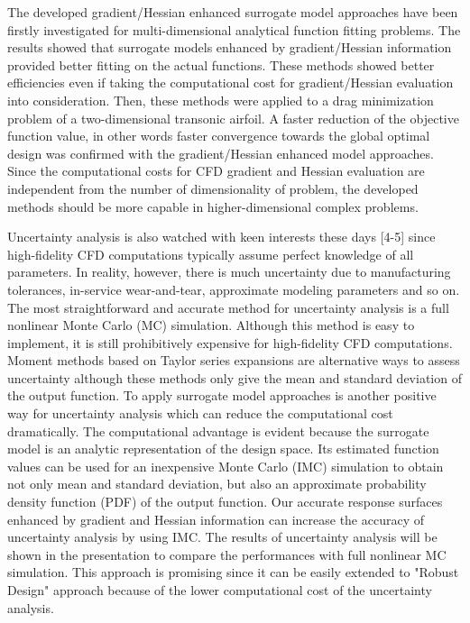 \documentclass{report}
\begin{document}
The developed gradient/Hessian enhanced surrogate model approaches have
been firstly investigated for multi-dimensional analytical function
fitting problems. The results showed that surrogate models enhanced by
gradient/Hessian information provided better fitting on the actual
functions. These methods showed better efficiencies even if taking the
computational cost for gradient/Hessian evaluation into consideration.
Then, these methods were applied to a drag minimization problem of a
two-dimensional transonic airfoil. A faster reduction of the objective
function value, in other words faster convergence towards the global
optimal design was confirmed with the gradient/Hessian enhanced model
approaches. Since the computational costs for CFD gradient and Hessian
evaluation are independent from the number of dimensionality of problem,
the developed methods should be more capable in higher-dimensional
complex problems.

Uncertainty analysis is also watched with keen interests these days [4-5]
since high-fidelity CFD computations typically assume perfect knowledge
of all parameters. In reality, however, there is much uncertainty due to
manufacturing tolerances, in-service wear-and-tear, approximate modeling
parameters and so on. The most straightforward and accurate method for
uncertainty analysis is a full nonlinear Monte Carlo (MC) simulation.
Although this method is easy to implement, it is still prohibitively
expensive for high-fidelity CFD computations. Moment methods based on
Taylor series expansions are alternative ways to assess uncertainty
although these methods only give the mean and standard deviation of the
output function. To apply surrogate model approaches is another positive
way for uncertainty analysis which can reduce the computational cost
dramatically. The computational advantage is evident because the
surrogate model is an analytic representation of the design space. Its
estimated function values can be used for an inexpensive Monte Carlo
(IMC) simulation to obtain not only mean and standard deviation, but also
an approximate probability density function (PDF) of the output function.
Our accurate response surfaces enhanced by gradient and Hessian
information can increase the accuracy of uncertainty analysis by using
IMC. The results of uncertainty analysis will be shown in the
presentation to compare the performances with full nonlinear MC
simulation. This approach is promising since it can be easily extended to
"Robust Design" approach because of the lower computational cost of the
uncertainty analysis.
\end{document}
